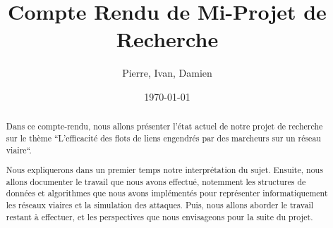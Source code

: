 \documentclass[a4paper, 11pt]{article}
\title{Compte Rendu de Mi-Projet de Recherche}
\author{Pierre, Ivan, Damien}
\date{\today}
\begin{document}
\maketitle


\begin{abstract}
Dans ce compte-rendu, nous allons présenter l'état actuel de notre projet de recherche sur le thème ``L'efficacité des flots de liens engendrés par des marcheurs sur un réseau viaire``.

Nous expliquerons dans un premier temps notre interprétation du sujet.
Ensuite, nous allons documenter le travail que nous avons effectué, notemment les structures de données et algorithmes que nous avons implémentés pour représenter informatiquement les réseaux viaires et la simulation des attaques.
Puis, nous allons aborder le travail restant à effectuer, et les perspectives que nous envisageons pour la suite du projet.
\end{abstract}

\tableofcontents











\end{document}
